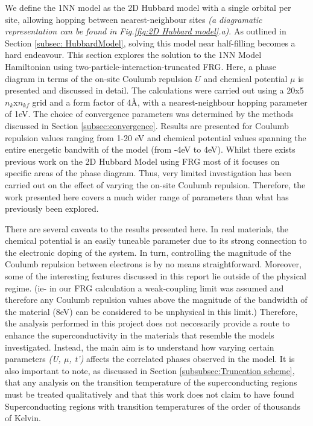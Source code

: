 \documentclass[12pt]{article}
\begin{document}
We define the 1NN model as the 2D Hubbard model with a single orbital per site,  allowing hopping between nearest-neighbour sites \textit{(a diagramatic representation can be found in Fig.\ref{fig:2D Hubbard model}.a)}. 
As outlined in Section \ref{subsec: HubbardModel}, solving this model near half-filling becomes a hard endeavour. 
This section explores the solution to the 1NN Model Hamiltonian using  two-particle-interaction-truncated FRG.
Here, a phase diagram in terms of the on-site Coulumb repulsion $U$ and chemical
potential $\mu$ is presented and discussed in detail. The calculations were carried out using a 20x5 $n_k$x$n_{kf}$ grid and a form factor
of 4\AA, with a  nearest-neighbour hopping parameter of 1eV.  The choice of convergence parameters was determined by the methods discussed in Section \ref{subsec:convergence}. 
Results are presented for Coulumb repulsion values  ranging from 1-20 eV and chemical potential
values spanning the entire energetic bandwith of the model (from -4eV to 4eV). 
Whilst there exists previous work on the 2D Hubbard Model using FRG\cite{beyer2023rashba,hille2020quantitative,vilardi2020dynamical} 
most of it focuses on specific areas of the phase diagram. Thus,
very limited investigation has been carried out on the effect of varying the 
on-site Coulumb repulsion. Therefore, the work presented here covers a much wider range of parameters than what has previously been explored. 
\medskip




\noindent There are several caveats to the results presented here. In real materials,  the chemical potential is an easily tuneable parameter due to its strong connection to the electronic doping of the system.
In turn, controlling the magnitude of the Coulumb repulsion between electrons is by no means straightforward. 
Moreover, some of the interesting features discussed in this report lie outside of the physical regime. (ie- in our FRG calculation a weak-coupling limit was 
assumed and therefore any Coulumb repulsion values above the magnitude of the  bandwidth of the material (8eV) can be considered to be unphysical in this limit.)
Therefore, the analysis performed in this project does not neccesarily provide a route to enhance the superconductivity in the materials that resemble the models investigated.
Instead, the main aim is to understand how varying certain parameters \textit{(U, $\mu$, t')} affects the correlated phases observed in the model. It is also important to note, as discussed in Section \ref{subsubsec:Truncation scheme}, that any analysis on the transition temperature
of the superconducting regions must be treated qualitatively and that this work does not claim to have found Superconducting regions with transition temperatures of the order of thousands of Kelvin. \par 
\end{document}

